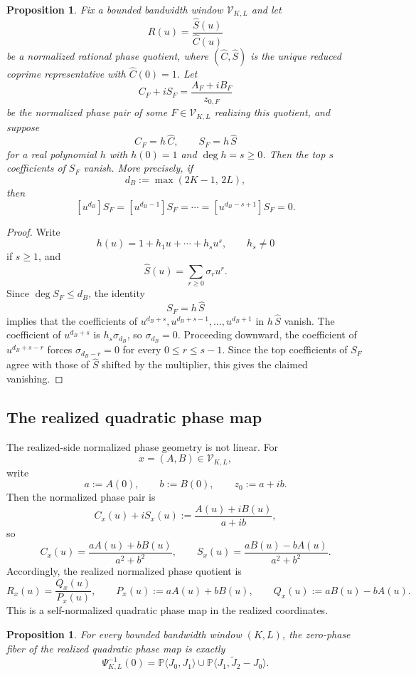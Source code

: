 \documentclass[11pt,reqno]{amsart}
\newtheorem{proposition}[theorem]{Proposition}
\theoremstyle{definition}
\newcommand{\PP}{\mathbb{P}}
\begin{document}
\begin{proposition}\label{prop:boundary-thinness}
Fix a bounded bandwidth window $\mathcal V_{K,L}$ and let
\[
R(u)=\frac{\widehat S(u)}{\widehat C(u)}
\]
be a normalized rational phase quotient, where $(\widehat C,\widehat S)$ is the unique reduced
coprime representative with $\widehat C(0)=1$. Let
\[
C_F+iS_F=\frac{A_F+iB_F}{z_{0,F}}
\]
be the normalized phase pair of some $F\in\mathcal V_{K,L}$ realizing this quotient, and suppose
\[
C_F=h\,\widehat C,\qquad S_F=h\,\widehat S
\]
for a real polynomial $h$ with $h(0)=1$ and $\deg h=s\ge 0$. Then the top $s$ coefficients of
$S_F$ vanish. More precisely, if
\[
d_B:=\max(2K-1,\,2L),
\]
then
\[
[u^{d_B}]S_F=[u^{d_B-1}]S_F=\cdots=[u^{d_B-s+1}]S_F=0.
\]
\end{proposition}

\begin{proof}
Write
\[
h(u)=1+h_1u+\cdots+h_su^s,
\qquad
h_s\neq 0
\]
if $s\ge 1$, and
\[
\widehat S(u)=\sum_{r\ge 0}\sigma_r u^r.
\]
Since $\deg S_F\le d_B$, the identity
\[
S_F=h\,\widehat S
\]
implies that the coefficients of $u^{d_B+s},u^{d_B+s-1},\dots,u^{d_B+1}$ in $h\,\widehat S$
vanish. The coefficient of $u^{d_B+s}$ is $h_s\sigma_{d_B}$, so $\sigma_{d_B}=0$. Proceeding
downward, the coefficient of $u^{d_B+s-r}$ forces $\sigma_{d_B-r}=0$ for every
$0\le r\le s-1$. Since the top coefficients of $S_F$ agree with those of $\widehat S$ shifted by
the multiplier, this gives the claimed vanishing.
\end{proof}

\subsection*{The realized quadratic phase map}

The realized-side normalized phase geometry is not linear. For
\[
x=(A,B)\in\mathcal V_{K,L},
\]
write
\[
a:=A(0),
\qquad
b:=B(0),
\qquad
z_0:=a+ib.
\]
Then the normalized phase pair is
\[
C_x(u)+iS_x(u):=\frac{A(u)+iB(u)}{a+ib},
\]
so
\[
C_x(u)=\frac{aA(u)+bB(u)}{a^2+b^2},
\qquad
S_x(u)=\frac{aB(u)-bA(u)}{a^2+b^2}.
\]
Accordingly, the realized normalized phase quotient is
\[
R_x(u)=\frac{Q_x(u)}{P_x(u)},
\qquad
P_x(u):=aA(u)+bB(u),
\qquad
Q_x(u):=aB(u)-bA(u).
\]
This is a self-normalized quadratic phase map in the realized coordinates.

\begin{proposition}\label{prop:zero-phase-fiber}
For every bounded bandwidth window $(K,L)$, the zero-phase fiber of the realized quadratic phase
map is exactly
\[
\Psi_{K,L}^{-1}(0)
=
\PP\langle J_0,J_1\rangle
\cup
\PP\langle J_1,\widetilde J_2-J_0\rangle.
\]
\end{proposition}
\end{document}
